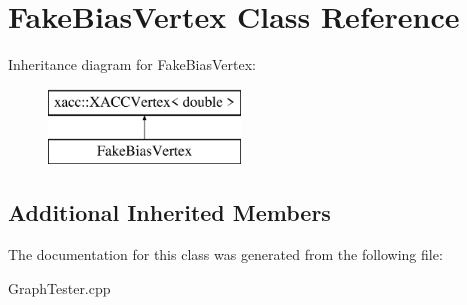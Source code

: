 \hypertarget{a01567}{}\section{Fake\+Bias\+Vertex Class Reference}
\label{a01567}
Inheritance diagram for Fake\+Bias\+Vertex\+:\begin{figure}[H]
\begin{center}
\leavevmode
\includegraphics[height=2.000000cm]{a01567}
\end{center}
\end{figure}
\subsection*{Additional Inherited Members}


The documentation for this class was generated from the following file\+:\begin{DoxyCompactItemize}
\item 
Graph\+Tester.\+cpp\end{DoxyCompactItemize}
